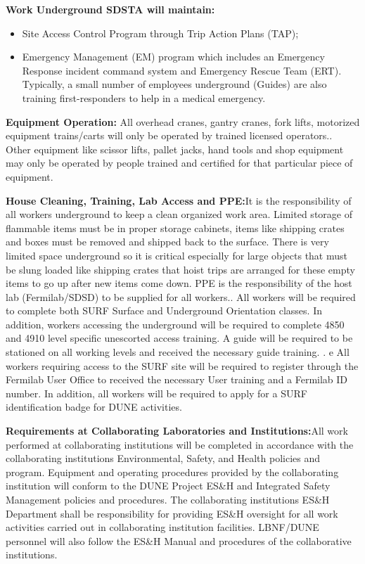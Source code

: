 {\bf Work Underground SDSTA will maintain:}
\begin{itemize}
    \item Site Access Control Program through Trip Action Plans (TAP);
    \item Emergency Management (EM) program which includes an Emergency Response incident command system and  Emergency Rescue Team (ERT).  Typically, a small number of employees underground (Guides) are also training first-responders to help in a medical emergency.
    
\end{itemize}

{\bf Equipment Operation:} All overhead cranes, gantry cranes, fork lifts, motorized equipment trains/carts will only be operated by trained licensed operators.. 
Other equipment like scissor lifts, pallet jacks, hand tools and shop equipment may only be operated by people trained
and certified for that particular piece of equipment.

{\bf House Cleaning, Training, Lab Access and PPE:}It is the responsibility of all workers underground to keep a clean organized work area. Limited storage of flammable items must be in proper storage cabinets, items like shipping crates and boxes must be removed and shipped back to the surface. There is very limited space underground so it is critical especially for large objects that must be slung loaded like shipping crates that hoist trips are arranged for these empty items to go up after new items come down. PPE is the responsibility of the host lab (Fermilab/SDSD) to be supplied for all workers.. All workers will be required to complete both SURF Surface and Underground Orientation classes. In addition, workers accessing the underground will be required to complete 4850 and 4910 level specific unescorted access training. A guide will be required to be stationed on all working levels and received the necessary guide training. .  e All workers requiring access to the SURF site will be required to register through the Fermilab User Office to received the necessary User training and a Fermilab ID number. In addition, all workers will be required to apply for a SURF identification badge for DUNE activities.

{\bf Requirements at Collaborating Laboratories and Institutions:}All work performed at collaborating institutions will be completed in accordance with the collaborating institutions Environmental, Safety, and Health policies and program. 
Equipment and operating procedures provided by the collaborating institution will conform to the DUNE Project ES\&H and Integrated Safety Management policies and procedures. 
The collaborating institutions ES\&H Department shall be responsibility for providing ES\&H oversight for all work activities carried out in collaborating institution facilities. 
LBNF/DUNE personnel will also follow the ES\&H Manual and procedures of the collaborative institutions.


